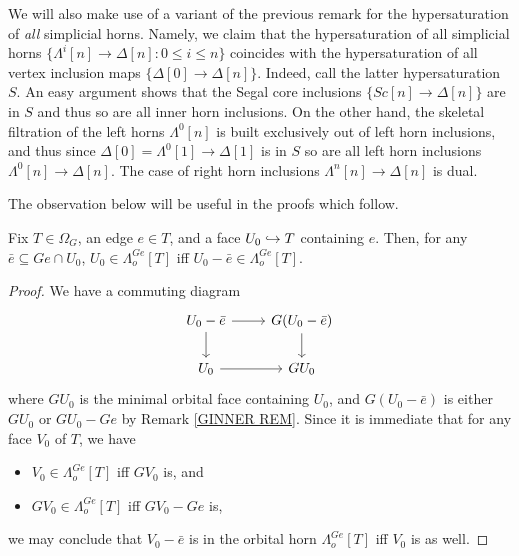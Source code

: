 \documentclass[a4paper,10pt,draft]{article}%
\begin{document}
\begin{remark}\label{HYPERSATKAN REM}
	We will also make use of a variant of the previous remark for the hypersaturation of \textit{all} simplicial horns.
	Namely, we claim that the hypersaturation of all simplicial horns 
	$\{\Lambda^i[n] \to \Delta[n] \colon 0 \leq i \leq n\}$
	coincides with the hypersaturation of all vertex inclusion maps
	$\{\Delta[0] \to \Delta[n]\}$.
	Indeed, call the latter hypersaturation $S$. 
	An easy argument shows that the Segal core inclusions 
	$\{Sc[n] \to \Delta[n]\}$ are in $S$ and thus so are all inner horn inclusions. On the other hand, the skeletal filtration of the left horns $\Lambda^0[n]$ is built exclusively out of left horn inclusions, and thus since $\Delta[0]=\Lambda^0[1] \to \Delta[1]$ is in $S$ so are all left horn inclusions 
	$\Lambda^0[n] \to \Delta[n]$. The case of right horn inclusions $\Lambda^n[n] \to \Delta[n]$ is dual.
\end{remark}



The observation below will be useful in the proofs which follow.
\begin{lemma}
      \label{FOF_OHORN_LEM}
      Fix $T \in \Omega_G$, an edge $e \in T$, and a face $U_0 \hookrightarrow T$ containing $e$. Then,
      for any $\bar e \subseteq G e \cap U_0$,
      $U_0 \in \Lambda^{G e}_o[T]$ iff $U_0 - \bar e \in \Lambda^{G e}_o[T]$. 
\end{lemma}
\begin{proof}
      We have a commuting diagram
      \begin{equation}
            \begin{tikzcd}
                  U_0 - \bar e \arrow[r] \arrow[d]
                  &
                  G (U_0 - \bar e) \arrow[d]
                  \\
                  U_0\arrow[r]
                  &
                  G U_0
            \end{tikzcd}
      \end{equation}
      where $G U_0$ is the minimal orbital face containing $U_0$, and
      $G (U_0 - \bar e)$ is either $G U_0$ or $G U_0 - G e$ by Remark \ref{GINNER REM}.
      Since it is immediate that for any face $V_0$ of $T$, we have
      \begin{itemize}
      \item $V_0 \in \Lambda^{G e}_o[T]$ iff $G V_0$ is, and
      \item $G V_0 \in \Lambda^{G e}_o[T]$ iff $G V_0 - G e$ is,
      \end{itemize}
      we may conclude that
      $V_0 - \bar e$ is in the orbital horn $\Lambda^{G e}_o[T]$
      iff
      $V_0$ is as well.
\end{proof}
\end{document}

